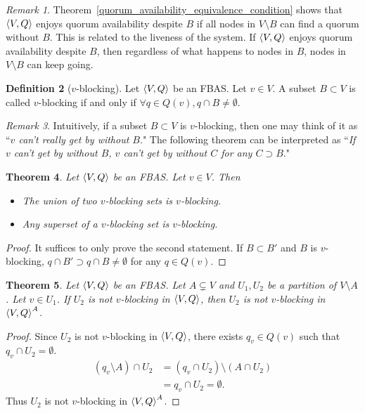 \documentclass[12pt, psamsfonts]{amsart}
\newtheorem{thm}{Theorem}[subsection]
\theoremstyle{definition}
\newtheorem{defn}[thm]{Definition}
\theoremstyle{remark}
\newtheorem{rem}[thm]{Remark}
\numberwithin{equation}{subsection}
\begin{document}
\begin{rem}
    Theorem~\ref{quorum_availability_equivalence_condition} shows that $\ev{V, Q}$ enjoys quorum availability despite $B$ if all nodes in $V \setminus B$ can find a quorum without $B$.
    This is related to the liveness of the system.
    If $\ev{V, Q}$ enjoys quorum availability despite $B$, then regardless of what happens to nodes in $B$, nodes in $V \setminus B$ can keep going.
\end{rem}

\begin{defn}[$v$-blocking]\label{def_v_blocking}
    Let $\ev{V, Q}$ be an FBAS\@.
    Let $v \in V$.
    A subset $B \subset V$ is called $v$-blocking if and only if $\forall q \in Q(v), q \cap B \ne \emptyset$.
\end{defn}

\begin{rem}
    Intuitively, if a subset $B \subset V$ is $v$-blocking, then one may think of it as ``\textit{$v$ can't really get by without $B$}."
    The following theorem can be interpreted as ``\textit{If $v$ can't get by without $B$, $v$ can't get by without $C$ for any $C \supset B$}."
\end{rem}

\begin{thm}\label{basic_prop_v_blocking}
    Let $\ev{V, Q}$ be an FBAS\@.
    Let $v \in V$.
    Then
    \begin{itemize}
        \item
            The union of two $v$-blocking sets is $v$-blocking.
        \item
            Any superset of a $v$-blocking set is $v$-blocking.
    \end{itemize}
\end{thm}

\begin{proof}
    It suffices to only prove the second statement.
    If $B \subset B'$ and $B$ is $v$-blocking, $q \cap B' \supset q \cap B \ne \emptyset$ for any $q \in Q(v)$.
\end{proof}

\begin{thm}\label{v_blocking_delete}
    Let $\ev{V, Q}$ be an FBAS\@.
    Let $A \subsetneq V$ and $U_1, U_2$ be a partition of $V \setminus A$.
    Let $v \in U_1$.
    If $U_2$ is not $v$-blocking in $\ev{V, Q}$, then $U_2$ is not $v$-blocking in $\ev{V, Q}^A$.
\end{thm}

\begin{proof}
    Since $U_2$ is not $v$-blocking in $\ev{V, Q}$, there exists $q_v \in Q(v)$ such that $q_v \cap U_2 = \emptyset$.
    \begin{align*}
        (q_v \setminus A) \cap U_2
            &= (q_v \cap U_2) \setminus (A \cap U_2) \\
            &= q_v \cap U_2 = \emptyset.
    \end{align*}
    Thus $U_2$ is not $v$-blocking in $\ev{V, Q}^A$.
\end{proof}
\end{document}
